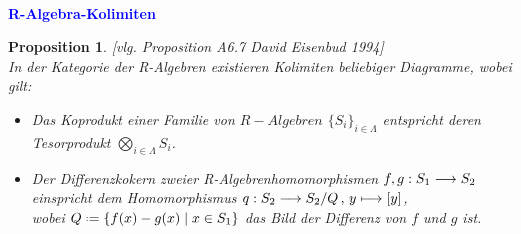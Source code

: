 \documentclass[10pt,a4paper]{report}
\newcommand{\ModulsOfDifferenzials}{David Eisenbud 1994}
\newcounter{Aussage}[chapter]
\newtheorem{prop}[Aussage]{Proposition}
\newcommand{\functionfront}[3]{\nolinebreak{#1:#2 \longrightarrow #3}}
\newcommand{\function}[5]{\nolinebreak{#1:#2 \longrightarrow #3 \, , \, #4 \longmapsto #5}}
\newcommand*{\defeq}{\mathrel{\vcenter{\baselineskip0.5ex \lineskiplimit0pt
                     \hbox{\scriptsize.}\hbox{\scriptsize.}}}%
                     =}
\begin{document}
\ \\
\textcolor{blue}{\textbf{R-Algebra-Kolimiten}}
\begin{prop} \label{R-Algebra-Kolimiten} \textit{[vlg. Proposition A6.7 \ModulsOfDifferenzials]}\\
In der Kategorie der R-Algebren existieren Kolimiten beliebiger Diagramme, wobei gilt:
\begin{itemize}
\item[\textbf{1.}] Das Koprodukt einer Familie von $R-Algebren$ $\lbrace S_i \rbrace_{i \in \Lambda}$ entspricht deren Tesorprodukt $\bigotimes_{i \in \Lambda} S_i$. 
\item[\textbf{2.}] Der Differenzkokern zweier R-Algebrenhomomorphismen $\functionfront{f,g}{S_1}{S_2}$ einspricht dem Homomorphismus $\function{q}{S_2}{S_2/Q}{y}{[y]}$,\\
wobei $Q \defeq \lbrace f(x) - g(x)\mid x \in S_1 \rbrace$ das Bild der Differenz von $f$ und $g$ ist.
\end{itemize}
\end{prop}
\end{document}
